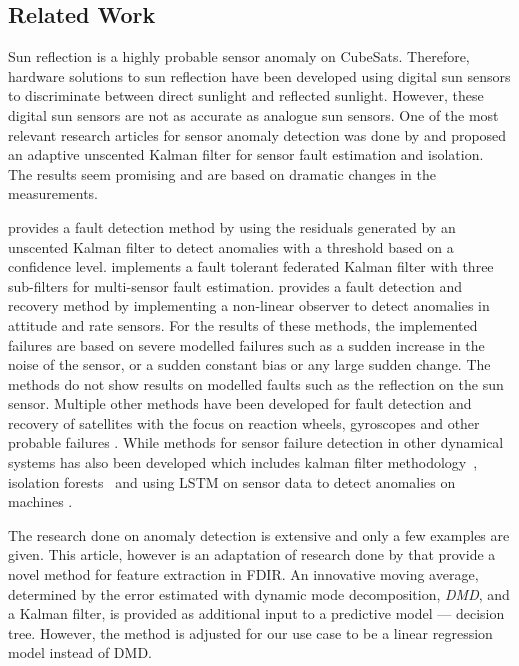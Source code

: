 \documentclass[letterpaper, 10 pt, conference]{ieeeconf}  %
\begin{document}
\subsection{Related Work}
Sun reflection is a highly probable sensor anomaly on CubeSats. Therefore, hardware solutions to sun reflection have been developed using digital sun sensors to discriminate between direct sunlight and reflected sunlight. However, these digital sun sensors are not as accurate as analogue sun sensors. One of the most relevant research articles for sensor anomaly detection was done by \textcite{wang2019adaptive} and proposed an adaptive unscented Kalman filter for sensor fault estimation and isolation. The results seem promising and are based on dramatic changes in the measurements. 

\textcite{Xiong2007} provides a fault detection method by using the residuals generated by an unscented Kalman filter to detect anomalies with a threshold based on a confidence level. \textcite{Zhou2016} implements a fault tolerant federated Kalman filter with three sub-filters for multi-sensor fault estimation. \textcite{Nasrolahi2018} provides a fault detection and recovery method by implementing a non-linear observer to detect anomalies in attitude and rate sensors. For the results of these methods, the implemented failures are based on severe modelled failures such as a sudden increase in the noise of the sensor, or a sudden constant bias or any large sudden change. The methods do not show results on modelled faults such as the reflection on the sun sensor. Multiple other methods have been developed for fault detection and recovery of satellites with the focus on reaction wheels, gyroscopes and other probable failures \cite{Tudoroiu2007, Pilastre2020, rahimi2020fault, jin2008fault, wander2013innovative, ibrahim2018machine, ibrahim2020machine}. While methods for sensor failure detection in other dynamical systems has also been developed which includes kalman filter methodology~\cite{Ciftciogl1991}, isolation forests~\cite{Liu2021} and using LSTM on sensor data to detect anomalies on machines \cite{Malhotra2016}. 

The research done on anomaly detection is extensive and only a few examples are given. This article, however is an adaptation of research done by \textcite{DeSilva2020} that provide a novel method for feature extraction in FDIR. An innovative moving average, determined by the error estimated with dynamic mode decomposition, \emph{DMD}, and a Kalman filter, is provided as additional input to a predictive model --- decision tree. However, the method is adjusted for our use case to be a linear regression model instead of DMD.
\end{document}
